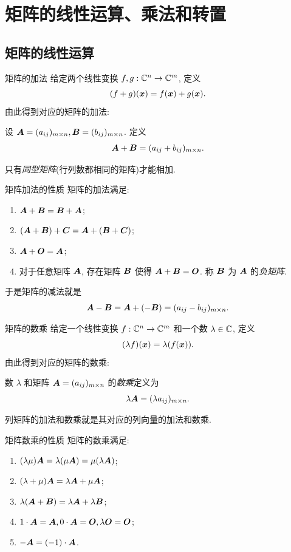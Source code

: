 \section{矩阵的线性运算、乘法和转置}


\subsection{矩阵的线性运算}
\begin{frame}{矩阵的加法}
	\onslide<+->
	给定两个线性变换 $f,g:{\mathbb{C}}^n\rightarrow{\mathbb{C}}^m$,
	\onslide<+->
	定义
	\[(f+g)({\boldsymbol{x}})=f({\boldsymbol{x}})+g({\boldsymbol{x}}).\]
	\onslide<+->
	由此得到对应的矩阵的加法:
	\onslide<+->
	\begin{definition}
		设 ${\boldsymbol{A}}=(a_{ij})_{m\times n},{\boldsymbol{B}}=(b_{ij})_{m\times n}$.
		定义
		\[{\boldsymbol{A}}+{\boldsymbol{B}}=(a_{ij}+b_{ij})_{m\times n}.\]
	\end{definition}
	\onslide<+->
	只有\emph{同型矩阵}(行列数都相同的矩阵)才能相加.
\end{frame}


\begin{frame}{矩阵加法的性质}
	\onslide<+->
	矩阵的加法满足:
	\begin{enumerate}
		\item ${\boldsymbol{A}}+{\boldsymbol{B}}={\boldsymbol{B}}+{\boldsymbol{A}}$;
		\item $({\boldsymbol{A}}+{\boldsymbol{B}})+{\boldsymbol{C}}={\boldsymbol{A}}+({\boldsymbol{B}}+{\boldsymbol{C}})$;
		\item ${\boldsymbol{A}}+{\boldsymbol{O}}={\boldsymbol{A}}$;
		\item 对于任意矩阵 ${\boldsymbol{A}}$, 存在矩阵 ${\boldsymbol{B}}$ 使得 ${\boldsymbol{A}}+{\boldsymbol{B}}={\boldsymbol{O}}$.
		称 ${\boldsymbol{B}}$ 为 ${\boldsymbol{A}}$ 的\emph{负矩阵}.
	\end{enumerate}
	\onslide<+->
	于是矩阵的减法就是
	\[{\boldsymbol{A}}-{\boldsymbol{B}}={\boldsymbol{A}}+(-{\boldsymbol{B}})=(a_{ij}-b_{ij})_{m\times n}.\]
\end{frame}


\begin{frame}{矩阵的数乘}
	\onslide<+->
	给定一个线性变换 $f:{\mathbb{C}}^n\rightarrow{\mathbb{C}}^m$ 和一个数 $\lambda\in{\mathbb{C}}$, 
	\onslide<+->
	定义
	\[(\lambda f)({\boldsymbol{x}})=\lambda(f({\boldsymbol{x}})).\]
	\onslide<+->
	由此得到对应的矩阵的数乘:
	\onslide<+->
	\begin{definition}
		数 $\lambda$ 和矩阵 ${\boldsymbol{A}}=(a_{ij})_{m\times n}$ 的\emph{数乘}定义为
		\[\lambda{\boldsymbol{A}}=(\lambda a_{ij})_{m\times n}.\]
	\end{definition}
	\onslide<+->
	列矩阵的加法和数乘就是其对应的列向量的加法和数乘.
\end{frame}


\begin{frame}{矩阵数乘的性质}
	\onslide<+->
	矩阵的数乘满足:
	\begin{enumerate}
		\item $(\lambda \mu){\boldsymbol{A}}=\lambda(\mu{\boldsymbol{A}})=\mu(\lambda{\boldsymbol{A}})$;
		\item $(\lambda+\mu){\boldsymbol{A}}=\lambda{\boldsymbol{A}}+\mu{\boldsymbol{A}}$;
		\item $\lambda({\boldsymbol{A}}+{\boldsymbol{B}})=\lambda{\boldsymbol{A}}+\lambda{\boldsymbol{B}}$;
		\item $1\cdot {\boldsymbol{A}}={\boldsymbol{A}}, 0\cdot{\boldsymbol{A}}={\boldsymbol{O}},\lambda{\boldsymbol{O}}={\boldsymbol{O}}$;
		\item $-{\boldsymbol{A}}=(-1)\cdot{\boldsymbol{A}}$.
	\end{enumerate}
\end{frame}


